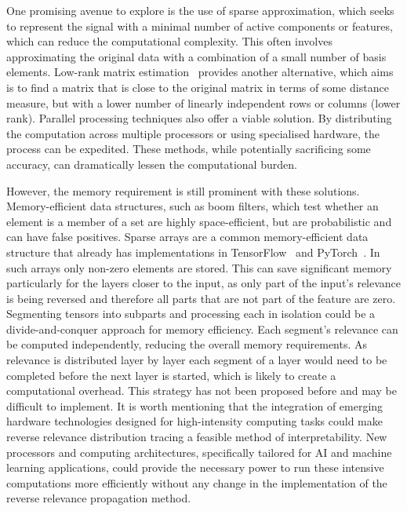 One promising avenue to explore is the use of sparse approximation, which seeks to represent the signal with a minimal number of active components or features, which can reduce the computational complexity. This often involves approximating the original data with a combination of a small number of basis elements. Low-rank matrix estimation~\cite{1102314} provides another alternative, which aims is to find a matrix that is close to the original matrix in terms of some distance measure, but with a lower number of linearly independent rows or columns (\ie lower rank). Parallel processing techniques also offer a viable solution. By distributing the computation across multiple processors or using specialised hardware, the process can be expedited. These methods, while potentially sacrificing some accuracy, can dramatically lessen the computational burden. 


However, the memory requirement is still prominent with these solutions. Memory-efficient data structures, such as boom filters, which test whether an element is a member of a set are highly space-efficient, but are probabilistic and can have false positives. Sparse arrays are a common memory-efficient data structure that already has implementations in TensorFlow~\cite{tensorflow2015} and PyTorch~\cite{NEURIPS2019_9015}. In such arrays only non-zero elements are stored. This can save significant memory particularly for the layers closer to the input, as only part of the input's relevance is being reversed and therefore all parts that are not part of the feature are zero. Segmenting tensors into subparts and processing each in isolation could be a divide-and-conquer approach for memory efficiency. Each segment's relevance can be computed independently, reducing the overall memory requirements. As relevance is distributed layer by layer each segment of a layer would need to be completed before the next layer is started, which is likely to create a computational overhead.
This strategy has not been proposed before and may be difficult to implement. It is worth mentioning that the integration of emerging hardware technologies designed for high-intensity computing tasks could make reverse relevance distribution tracing a feasible method of interpretability. New processors and computing architectures, specifically tailored for AI and machine learning applications, could provide the necessary power to run these intensive computations more efficiently without any change in the implementation of the reverse relevance propagation method.

